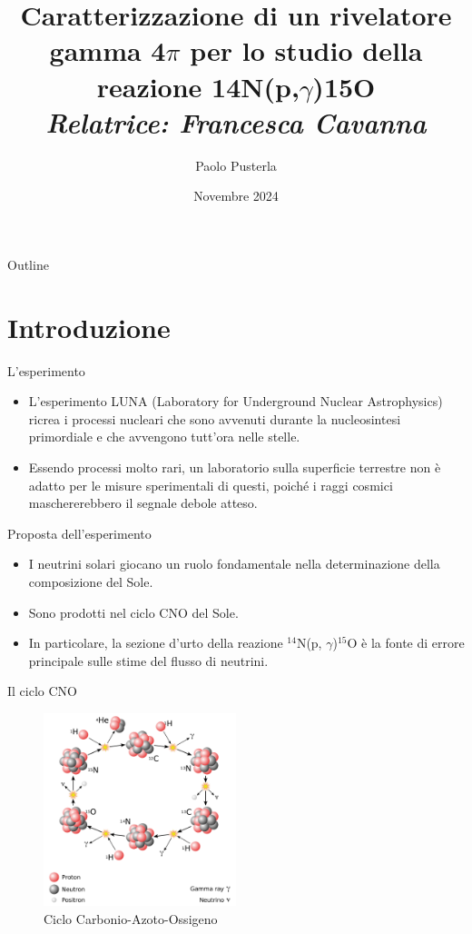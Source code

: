 \documentclass [xcolor=svgnames] {beamer}
\title[Short Title]{Caratterizzazione di un rivelatore gamma 4$\pi$ per lo studio della reazione 14N(p,$\gamma$)15O \\ \textit{Relatrice: Francesca Cavanna}}
\author[P. Pusterla]{Paolo Pusterla}
\institute[UniTo]{Università degli Studi di Torino}
\date{Novembre 2024}
\begin{document}
	
	\begin{frame}
		\titlepage
	\end{frame}
	
	\begin{frame}{Outline}
		\tableofcontents
	\end{frame}
	
	\section{Introduzione}
	\begin{frame}{L'esperimento}
		\begin{itemize}
			\item<1-> L'esperimento LUNA (Laboratory for Underground Nuclear Astrophysics) ricrea i processi nucleari che sono avvenuti durante la nucleosintesi primordiale e che avvengono tutt'ora nelle stelle.
			\item<2-> Essendo processi molto rari, un laboratorio sulla superficie terrestre non è adatto per le misure sperimentali di questi, poiché i raggi cosmici maschererebbero il segnale debole atteso.
		\end{itemize}
	\end{frame}
	
	
	\begin{frame}{Proposta dell'esperimento}
		\begin{itemize}
			\item<1-> I neutrini solari giocano un ruolo fondamentale nella determinazione della composizione del Sole.
			\item<2-> Sono prodotti nel ciclo CNO del Sole.
			\item<3-> In particolare, la sezione d'urto della reazione $^{14}$N(p, $\gamma$)$^{15}$O è la fonte di errore principale sulle stime del flusso di neutrini.
		\end{itemize}
	\end{frame}
		
	\begin{frame}{Il ciclo CNO}
		\begin{figure}[H]
			\includegraphics[width=0.5\textwidth]{img/CNO_Cycle.pdf}
			\caption{Ciclo Carbonio-Azoto-Ossigeno}
		\end{figure}
	\end{frame}
	
\end{document}
